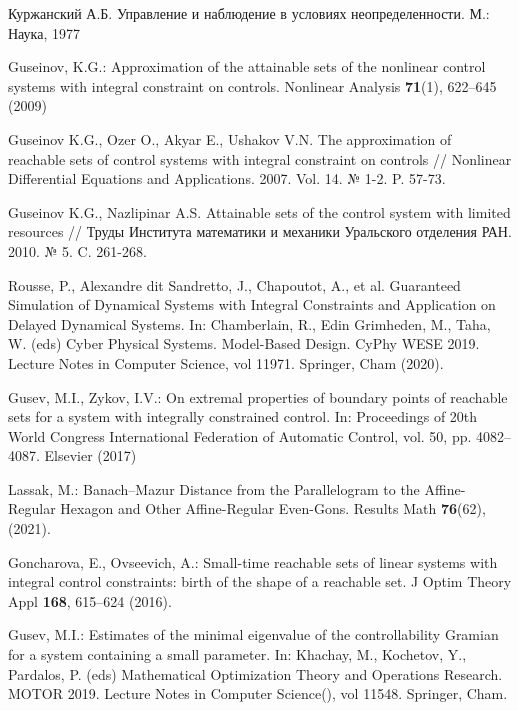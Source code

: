 \documentclass[../main.tex]{subfiles}
\begin{document}
\begin{thebibliography}{99}
Куржанский А.Б. Управление и наблюдение в условиях неопределенности. М.: Наука, 1977

Guseinov, K.G.: Approximation of the attainable sets of the nonlinear control systems with integral constraint on controls. Nonlinear Analysis \textbf{71}(1), 622--645 (2009) 

Guseinov K.G., Ozer O., Akyar E., Ushakov V.N. The approximation of reachable sets of control systems with integral constraint on controls // Nonlinear Differential Equations and Applications. 2007. Vol. 14. № 1-2. P. 57-73.

Guseinov K.G., Nazlipinar A.S. Attainable sets of the control system with limited resources // Труды Института математики и механики Уральского отделения РАН. 2010. № 5. C. 261-268.

Rousse, P., Alexandre dit Sandretto, J., Chapoutot, A., et al. Guaranteed Simulation of Dynamical Systems with Integral Constraints and Application on Delayed Dynamical Systems. In: Chamberlain, R., Edin Grimheden, M., Taha, W. (eds) Cyber Physical Systems. Model-Based Design. CyPhy WESE 2019. Lecture Notes in Computer Science, vol 11971. Springer, Cham (2020). 

Gusev, M.I., Zykov, I.V.: On extremal properties of boundary points of reachable sets for a system with integrally constrained control. In: Proceedings of 20th World Congress International Federation of Automatic Control, vol. 50, pp. 4082--4087. Elsevier (2017) 

Lassak, M.: Banach–Mazur Distance from the Parallelogram to the Affine-Regular Hexagon and Other Affine-Regular Even-Gons. Results Math \textbf{76}(62), (2021). 

Goncharova, E., Ovseevich, A.: Small-time reachable sets of linear systems with integral control constraints: birth of the shape of a reachable set. J Optim Theory Appl \textbf{168}, 615--624 (2016).

Gusev, M.I.: Estimates of the minimal eigenvalue of the controllability Gramian for a system containing a small parameter.  In: 
Khachay, M., Kochetov, Y., Pardalos, P. (eds) Mathematical Optimization Theory and Operations Research. MOTOR 
2019. Lecture Notes in Computer Science(), vol 11548. Springer, Cham. 


\end{thebibliography}
\end{document}

